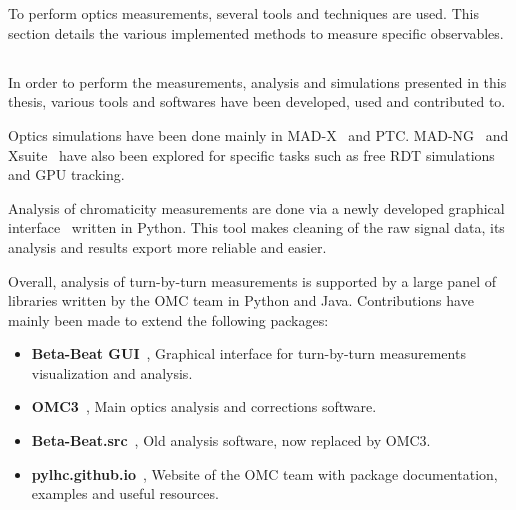 \section{}
\label{section:opticcs_meas}

To perform optics measurements, several tools and techniques are used. This section details the
various implemented methods to measure specific observables.

\subsection{}

In order to perform the measurements, analysis and simulations presented in this thesis, various
tools and softwares have been developed, used and contributed to.

Optics simulations have been done mainly in MAD-X~\cite{deniau_mad-x_nodate} and PTC.
MAD-NG~\cite{deniau_mad-ng_2020} and
Xsuite~\cite{g_iadarola_xsuite_nodate} have also been explored for specific tasks such as free RDT
simulations and GPU tracking.

Analysis of chromaticity measurements are done via a newly developed graphical
interface~\cite{m_le_garrec_non-linear_2022} written in Python. This tool makes cleaning of the raw
signal data, its analysis and results export more reliable and easier.

Overall, analysis of turn-by-turn measurements is supported by a large panel of libraries written by
the OMC team in Python and Java. Contributions have mainly been made to extend the following
packages:


\begin{itemize}
    \item \textbf{Beta-Beat GUI}~\cite{omc-team_beta-beat_2008}, Graphical interface for
    turn-by-turn measurements visualization and analysis.
    \item \textbf{OMC3}~\cite{omc-team_omc3_2021}, Main optics analysis and corrections software.
    \item \textbf{Beta-Beat.src}~\cite{omc-team_beta-beatsrc_2018}, Old analysis software, now
    replaced by OMC3.
    \item \textbf{pylhc.github.io}~\cite{omc-team_omc_2020}, Website of the OMC team with package
    documentation, examples and useful resources.
\end{itemize}


